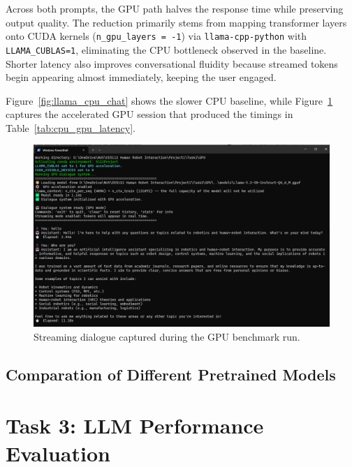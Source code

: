 \documentclass[12pt,a4paper]{article}
\begin{document}
Across both prompts, the GPU path halves the response time while preserving output quality. The reduction primarily stems from mapping transformer layers onto CUDA kernels (\texttt{n\_gpu\_layers = -1}) via \texttt{llama-cpp-python} with \texttt{LLAMA\_CUBLAS=1}, eliminating the CPU bottleneck observed in the baseline. Shorter latency also improves conversational fluidity because streamed tokens begin appearing almost immediately, keeping the user engaged.

Figure~\ref{fig:llama_cpu_chat} shows the slower CPU baseline, while Figure~\ref{fig:llama_gpu_chat} captures the accelerated GPU session that produced the timings in Table~\ref{tab:cpu_gpu_latency}.

\begin{figure}[H]
    \centering
    \includegraphics[width=1\linewidth]{Figures/llamaGPU.png}
    \caption{Streaming dialogue captured during the GPU benchmark run.}
    \label{fig:llama_gpu_chat}
\end{figure}

\subsection{Comparation of Different Pretrained Models}

\section{Task 3: LLM Performance Evaluation}
\end{document}
